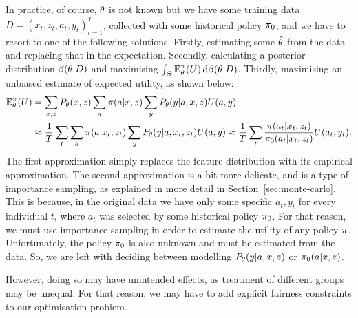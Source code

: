 \begin{frame}
{    
    In practice, of course, $\theta$ is not known but we have some training data $D = (x_t, z_t, a_t, y_t)_{t=1}^T$, collected with some historical policy $\pi_0$, and  we have to resort to one of the following solutions. Firstly, estimating some $\hat{\theta}$ from the data and replacing that in the expectation. Secondly, calculating a posterior distribution $\beta(\theta | D)$ and maximising $\int_\Theta \mathop{\mbox{\ensuremath{\mathbb{E}}}}\nolimits_\theta^\pi(U) \,\mathrm{d} \beta(\theta | D)$. Thirdly, maximising an unbiased estimate of expected utility, as shown below:
    \begin{align*}
      \mathop{\mbox{\ensuremath{\mathbb{E}}}}\nolimits^\pi_\theta(U)
      &=
        \sum_{x,z} P_\theta(x, z) \sum_a \pi(a | x, z) \sum_y P_\theta(y | a, x, z) U(a,y) \\
      &\approx
        \frac{1}{T} \sum_{t} \sum_a \pi(a | x_t, z_t) \sum_y P_\theta(y | a, x_t, z_t) U(a,y)
        \approx
        \frac{1}{T} \sum_{t} \frac{\pi(a_t | x_t, z_t)}{\pi_0(a_t | x_t, z_t)} U(a_t,y_t).
    \end{align*}
    The first approximation simply replaces the feature distribution with its empirical approximation.
    The second approximation is a bit more delicate, and is a type of importance sampling, as explained in more detail in Section~\ref{sec:monte-carlo}.
    This is because, in the original data we have only some specific $a_t, y_t$ for every individual $t$, where $a_t$ was selected by some historical policy $\pi_0$. For that reason, we must use importance sampling in order to estimate the utility of any policy $\pi$. Unfortunately, the policy $\pi_0$ is also unknown and must be estimated from the data. So, we are left with deciding between modelling $P_\theta(y | a, x, z)$ or $\pi_0(a | x, z)$.

    However, doing so may have unintended effects, as treatment of different groups may be unequal. For that reason, we may have to add explicit fairness constraints to our optimisation problem. 

  }
\end{frame}  

